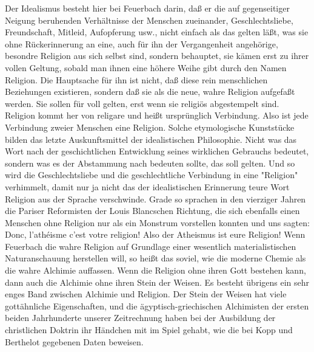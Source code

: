 Der Idealismus besteht hier bei Feuerbach darin, daß er die auf
gegenseitiger Neigung beruhenden Verhältnisse der Menschen zueinander,
Geschlechtsliebe, Freundschaft, Mitleid, Aufopferung usw., nicht einfach
als das gelten läßt, was sie ohne Rückerinnerung an eine, auch für ihn
der Vergangenheit angehörige, besondre Religion aus sich selbst sind,
sondern behauptet, sie kämen erst zu ihrer vollen Geltung, sobald man
ihnen eine höhere Weihe gibt durch den Namen Religion. Die Hauptsache
für ihn ist nicht, daß diese rein menschlichen Beziehungen existieren,
sondern daß sie als die neue, wahre Religion aufgefaßt werden. Sie
sollen für voll gelten, erst wenn sie religiös abgestempelt sind.
Religion kommt her von religare und heißt ursprünglich Verbindung. Also
ist jede Verbindung zweier Menschen eine Religion. Solche etymologische
Kunststücke bilden das letzte Auskunftsmittel der idealistischen
Philosophie. Nicht was das Wort nach der geschichtlichen Entwicklung
seines wirklichen Gebrauchs bedeutet, sondern was es der Abstammung nach
bedeuten sollte, das soll gelten. Und so wird die Geschlechtsliebe und
die geschlechtliche Verbindung in eine "Religion" verhimmelt, damit nur
ja nicht das der idealistischen Erinnerung teure Wort Religion aus der
Sprache verschwinde. Grade so sprachen in den vierziger Jahren die
Pariser Reformisten der Louis Blancschen Richtung, die sich ebenfalls
einen Menschen ohne Religion nur als ein Monstrum vorstellen konnten und
uns sagten: Donc, l'athéisme c'est votre religion! \textbar{}Also der
Atheismus ist eure Religion!\textbar{} Wenn Feuerbach die wahre Religion
auf Grundlage einer wesentlich materialistischen Naturanschauung
herstellen will, so heißt das soviel, wie die moderne Chemie als die
wahre Alchimie auffassen. Wenn die Religion ohne ihren Gott bestehen
kann, dann auch die Alchimie ohne ihren Stein der Weisen. Es besteht
übrigens ein sehr enges Band zwischen Alchimie und Religion. Der Stein
der Weisen hat viele gottähnliche Eigenschaften, und die
ägyptisch-griechischen Alchimisten der ersten beiden Jahrhunderte
unserer Zeitrechnung haben bei der Ausbildung der christlichen Doktrin
ihr Händchen mit im Spiel gehabt, wie die bei Kopp und Berthelot
gegebenen Daten beweisen.

